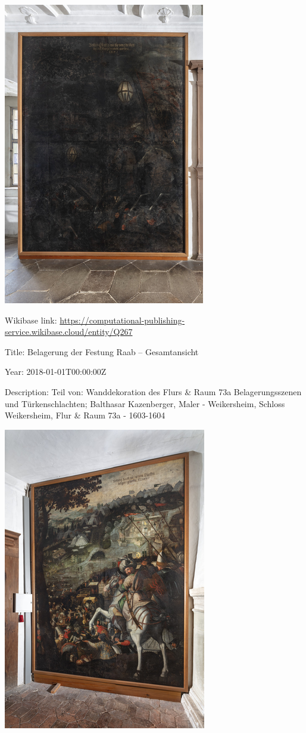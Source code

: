 \documentclass[
  letterpaper,
]{book}
\begin{document}
\includegraphics{paintings_files/figure-pdf/cell-3-output-82.png}

Wikibase link:
\url{https://computational-publishing-service.wikibase.cloud/entity/Q267}

Title: Belagerung der Festung Raab -- Gesamtansicht

Year: 2018-01-01T00:00:00Z

Description: Teil von: Wanddekoration des Flurs \& Raum 73a
Belagerungsszenen und Türkenschlachten; Balthasar Kazenberger, Maler -
Weikersheim, Schloss Weikersheim, Flur \& Raum 73a - 1603-1604

\includegraphics{paintings_files/figure-pdf/cell-3-output-84.png}
\end{document}
